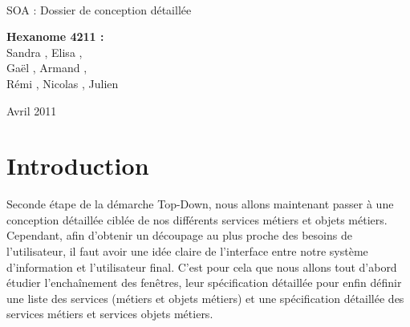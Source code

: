 \documentclass[a4paper]{article}
\begin{document}
\begin{titlepage}
~ 
\vfill
	\begin{center}
		\begin{Huge}
		SOA : Dossier de conception détaillée\\
		\end{Huge} 
\vfill
		\textbf{Hexanome 4211 :} 
		\\Sandra {}, Elisa , 
		\\Gaël , Armand , 
		\\Rémi , Nicolas , Julien \\

\vfill		
		\begin{Large}
		Avril 2011
		\end{Large}
\vfill

	\end{center}
\vfill
\end{titlepage}

\newpage
\tableofcontents
\newpage


\section*{Introduction}
Seconde étape de la démarche Top-Down, nous allons maintenant passer à une conception détaillée ciblée de nos différents services métiers et objets métiers. Cependant, afin d'obtenir un découpage au plus proche des besoins de l'utilisateur, il faut avoir une idée claire de l'interface entre notre système d'information et l'utilisateur final. C'est pour cela que nous allons tout d'abord étudier l'enchaînement des fenêtres, leur spécification détaillée pour enfin définir une liste des services (métiers et objets métiers) et une spécification détaillée des services métiers et services objets métiers.





\end{document}
